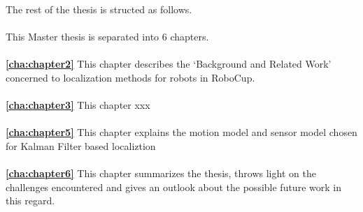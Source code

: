 The rest of the thesis is structed as follows.
\\
\\
\noindent This Master thesis is separated into 6 chapters.
\\
\\
\textbf{\autoref{cha:chapter2}} This chapter describes the `Background and Related Work' concerned to localization methods for robots in RoboCup. 
\\
\\
\textbf{\autoref{cha:chapter3}} This chapter xxx  
\\
\\
\textbf{\autoref{cha:chapter5}} This chapter explains the motion model and sensor model chosen for Kalman Filter based localiztion 
\\
\\
\textbf{\autoref{cha:chapter6}} This chapter summarizes the thesis, throws light on the challenges encountered and gives an outlook about the possible future work in this regard.
\\
\\
